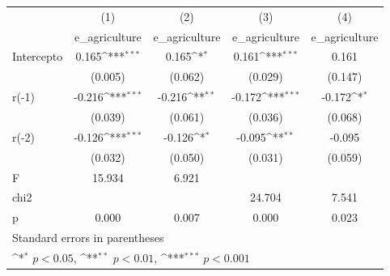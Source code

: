 {
\def\sym#1{\ifmmode^{#1}\else\(^{#1}\)\fi}
\begin{longtable}{l*{4}{c}}
\hline\hline\endfirsthead\hline\endhead\hline\endfoot\endlastfoot
            &\multicolumn{1}{c}{(1)}&\multicolumn{1}{c}{(2)}&\multicolumn{1}{c}{(3)}&\multicolumn{1}{c}{(4)}\\
            &\multicolumn{1}{c}{e\_agriculture}&\multicolumn{1}{c}{e\_agriculture}&\multicolumn{1}{c}{e\_agriculture}&\multicolumn{1}{c}{e\_agriculture}\\
\hline
Intercepto  &       0.165\sym{***}&       0.165\sym{*}  &       0.161\sym{***}&       0.161         \\
            &     (0.005)         &     (0.062)         &     (0.029)         &     (0.147)         \\
r(-1)       &      -0.216\sym{***}&      -0.216\sym{**} &      -0.172\sym{***}&      -0.172\sym{*}  \\
            &     (0.039)         &     (0.061)         &     (0.036)         &     (0.068)         \\
r(-2)       &      -0.126\sym{***}&      -0.126\sym{*}  &      -0.095\sym{**} &      -0.095         \\
            &     (0.032)         &     (0.050)         &     (0.031)         &     (0.059)         \\
\hline
F           &      15.934         &       6.921         &                     &                     \\
chi2        &                     &                     &      24.704         &       7.541         \\
p           &       0.000         &       0.007         &       0.000         &       0.023         \\
\hline\hline
\multicolumn{5}{l}{\footnotesize Standard errors in parentheses}\\
\multicolumn{5}{l}{\footnotesize \sym{*} \(p<0.05\), \sym{**} \(p<0.01\), \sym{***} \(p<0.001\)}\\
\end{longtable}
}
